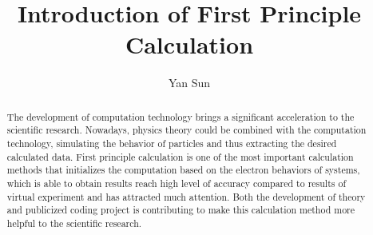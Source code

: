 \documentclass[letterpaper,12pt]{article}
\begin{document}
\title{Introduction of First Principle Calculation}
\author{Yan Sun}
\date{}
\maketitle

\begin{abstract}
The development of computation technology brings a significant acceleration to the scientific research. Nowadays, physics theory could be combined with the computation technology, simulating the behavior of particles and thus extracting the desired calculated data. First principle calculation is one of the most important calculation methods that initializes the computation based on the electron behaviors of systems, which is able to obtain results reach high level of accuracy compared to results of virtual experiment and has attracted much attention.  Both the development of theory and publicized coding project is contributing to make this calculation method more helpful to the scientific research.
\end{abstract}
\end{document}
